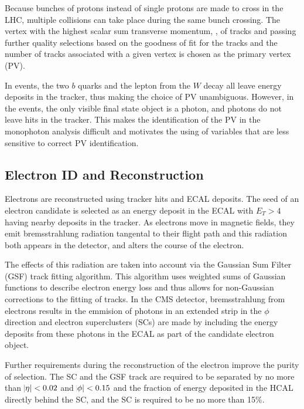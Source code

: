  Because bunches of protons instead of single protons
  are made to cross in the LHC, 
  multiple collisions can take place during the same
  bunch crossing.
 The vertex with the highest scalar sum
  transverse momentum, \pt,
  of tracks and passing further quality selections
  based on the goodness of fit for the tracks
  and the number of tracks associated with a given vertex
  is chosen as the primary vertex (PV).

 In \ppwbblnbb events, the two $b$ quarks and
  the lepton from the $W$ decay all leave energy
  deposits in the tracker, thus making the choice
  of PV unambiguous.
 However, in the \pploneg events,
  the only visible final state object is a photon,
  and photons do not leave hits in the tracker.
 This makes the identification of the PV
  in the monophoton analysis difficult
  and motivates the using of variables that
  are less sensitive to correct PV identification.
  
\subsection{Electron ID and Reconstruction}

 Electrons are reconstructed using tracker
  hits and ECAL deposits.
 The seed of an electron candidate is selected as 
  an energy deposit in the ECAL with $E_T > 4$ \GeV
  having nearby deposits in the tracker.
 As electrons move in magnetic fields,
  they emit bremsstrahlung radiation
  tangental to their flight path
  and this radiation both appears in the detector, 
  and alters the course of the electron.

 The effects of this radiation are taken
  into account via the Gaussian Sum Filter (GSF)
  track fitting algorithm.
 This algorithm uses weighted sums of Gaussian
  functions to describe electron energy loss
  and thus allows for non-Gaussian corrections
  to the fitting of tracks.
 In the CMS detector, 
  bremsstrahlung from electrons results in the
  emmision of photons in an extended strip
  in the $\phi$ direction and electron
  superclusters (SCs) are made by 
  including the energy deposits from 
  these photons in the ECAL as part of the
  candidate electron object.

 Further requirements during the reconstruction of
  the electron improve the purity of selection.
 The SC and the GSF track are required to 
  be separated by no more than $\abs{\eta}<0.02$
  and $\abs{\phi}<0.15$ and the fraction of
  energy deposited in the HCAL directly behind
  the SC, and the SC is required to be no more
  than 15\%.
 

